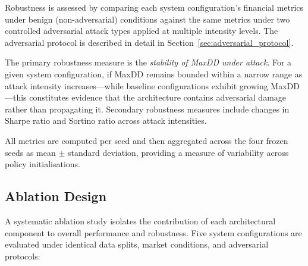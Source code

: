 Robustness is assessed by comparing each system configuration's financial
metrics under benign (non-adversarial) conditions against the same metrics under
two controlled adversarial attack types applied at multiple intensity levels.
The adversarial protocol is described in detail in
Section~\ref{sec:adversarial_protocol}.

The primary robustness measure is the \textit{stability of MaxDD
under attack}. For a given system configuration, if MaxDD remains bounded within a
narrow range as attack intensity increases---while baseline configurations
exhibit growing MaxDD---this constitutes evidence that the architecture contains
adversarial damage rather than propagating it. Secondary robustness measures
include changes in Sharpe ratio and Sortino ratio across attack intensities.

All metrics are computed per seed and then aggregated across the four frozen
seeds as mean $\pm$ standard deviation, providing a measure of variability
across policy initialisations.

\subsection{Ablation Design} \label{sec:ablation_design}

A systematic ablation study isolates the contribution of each architectural
component to overall performance and robustness. Five system configurations are
evaluated under identical data splits, market conditions, and adversarial
protocols:

